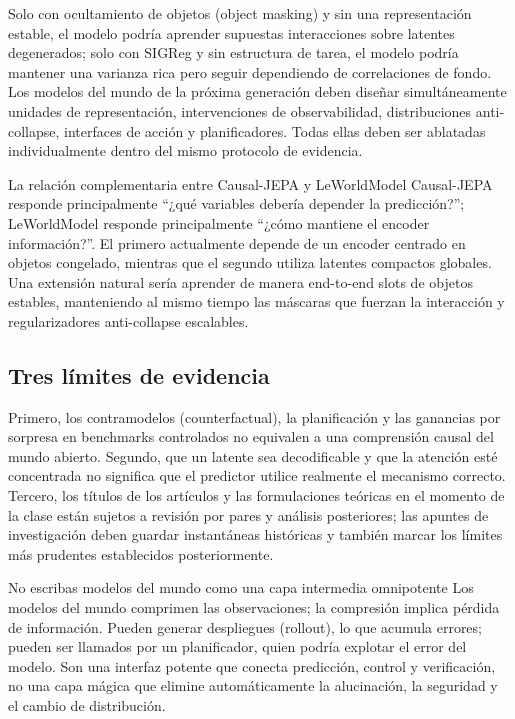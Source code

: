 Solo con ocultamiento de objetos (object masking) y sin una representación estable, el modelo podría aprender supuestas interacciones sobre latentes degenerados; solo con SIGReg y sin estructura de tarea, el modelo podría mantener una varianza rica pero seguir dependiendo de correlaciones de fondo. Los modelos del mundo de la próxima generación deben diseñar simultáneamente unidades de representación, intervenciones de observabilidad, distribuciones anti-collapse, interfaces de acción y planificadores. Todas ellas deben ser ablatadas individualmente dentro del mismo protocolo de evidencia.

\begin{knowledgebox}{La relación complementaria entre Causal-JEPA y LeWorldModel}
Causal-JEPA responde principalmente ``¿qué variables debería depender la predicción?''; LeWorldModel responde principalmente ``¿cómo mantiene el encoder información?''. El primero actualmente depende de un encoder centrado en objetos congelado, mientras que el segundo utiliza latentes compactos globales. Una extensión natural sería aprender de manera end-to-end slots de objetos estables, manteniendo al mismo tiempo las máscaras que fuerzan la interacción y regularizadores anti-collapse escalables.
\end{knowledgebox}

\subsection{Tres límites de evidencia}

Primero, los contramodelos (counterfactual), la planificación y las ganancias por sorpresa en benchmarks controlados no equivalen a una comprensión causal del mundo abierto. Segundo, que un latente sea decodificable y que la atención esté concentrada no significa que el predictor utilice realmente el mecanismo correcto. Tercero, los títulos de los artículos y las formulaciones teóricas en el momento de la clase están sujetos a revisión por pares y análisis posteriores; las apuntes de investigación deben guardar instantáneas históricas y también marcar los límites más prudentes establecidos posteriormente.

\begin{warningbox}{No escribas modelos del mundo como una capa intermedia omnipotente}
Los modelos del mundo comprimen las observaciones; la compresión implica pérdida de información. Pueden generar despliegues (rollout), lo que acumula errores; pueden ser llamados por un planificador, quien podría explotar el error del modelo. Son una interfaz potente que conecta predicción, control y verificación, no una capa mágica que elimine automáticamente la alucinación, la seguridad y el cambio de distribución.
\end{warningbox}

